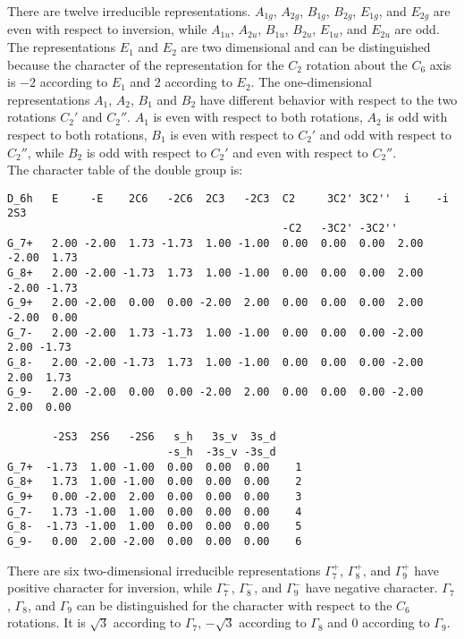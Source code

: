 \documentclass[12pt,a4paper]{article}
\begin{document}
There are twelve irreducible representations. $A_{1g}$, $A_{2g}$, $B_{1g}$, 
$B_{2g}$, $E_{1g}$, and $E_{2g}$ are even with respect to inversion, while
$A_{1u}$, $A_{2u}$, $B_{1u}$, $B_{2u}$, $E_{1u}$, and $E_{2u}$ are odd.
The representations $E_1$ and $E_2$ are two dimensional and can be
distinguished because the character of the representation for the $C_2$ 
rotation about the $C_6$ axis is $-2$ according to $E_1$ and $2$ according
to $E_2$. The one-dimensional representations $A_1$, $A_2$, $B_1$ and
$B_2$ have different behavior with respect to the two rotations $C_2'$ and
$C_2''$. $A_1$ is even with respect to both rotations, $A_2$ is odd with
respect to both rotations, $B_1$ is even with respect to $C_2'$ and odd with
respect to $C_2''$, while $B_2$ is odd with respect to $C_2'$ and even with
respect to $C_2''$. \\
The character table of the double group is:
\begin{footnotesize}
\begin{verbatim}
D_6h   E     -E    2C6   -2C6  2C3   -2C3  C2     3C2' 3C2''  i    -i    2S3  
                                           -C2   -3C2' -3C2''                  
G_7+   2.00 -2.00  1.73 -1.73  1.00 -1.00  0.00  0.00  0.00  2.00 -2.00  1.73
G_8+   2.00 -2.00 -1.73  1.73  1.00 -1.00  0.00  0.00  0.00  2.00 -2.00 -1.73
G_9+   2.00 -2.00  0.00  0.00 -2.00  2.00  0.00  0.00  0.00  2.00 -2.00  0.00
G_7-   2.00 -2.00  1.73 -1.73  1.00 -1.00  0.00  0.00  0.00 -2.00  2.00 -1.73
G_8-   2.00 -2.00 -1.73  1.73  1.00 -1.00  0.00  0.00  0.00 -2.00  2.00  1.73
G_9-   2.00 -2.00  0.00  0.00 -2.00  2.00  0.00  0.00  0.00 -2.00  2.00  0.00

       -2S3  2S6   -2S6   s_h   3s_v  3s_d
                         -s_h  -3s_v -3s_d
G_7+  -1.73  1.00 -1.00  0.00  0.00  0.00    1
G_8+   1.73  1.00 -1.00  0.00  0.00  0.00    2
G_9+   0.00 -2.00  2.00  0.00  0.00  0.00    3 
G_7-   1.73 -1.00  1.00  0.00  0.00  0.00    4
G_8-  -1.73 -1.00  1.00  0.00  0.00  0.00    5
G_9-   0.00  2.00 -2.00  0.00  0.00  0.00    6
\end{verbatim}
\end{footnotesize}
There are six two-dimensional irreducible representations $\Gamma_7^+$,
$\Gamma_8^+$, and $\Gamma_9^+$ have positive character for inversion, while
$\Gamma_7^-$, $\Gamma_8^-$, and $\Gamma_9^-$ have negative character. 
$\Gamma_7$, $\Gamma_8$,
and $\Gamma_9$ can be distinguished for the character with respect to the $C_6$
rotations. It is $\sqrt{3}$ according to $\Gamma_7$, $-\sqrt{3}$ according
to $\Gamma_8$ and $0$ according to $\Gamma_9$.\\
\end{document}
